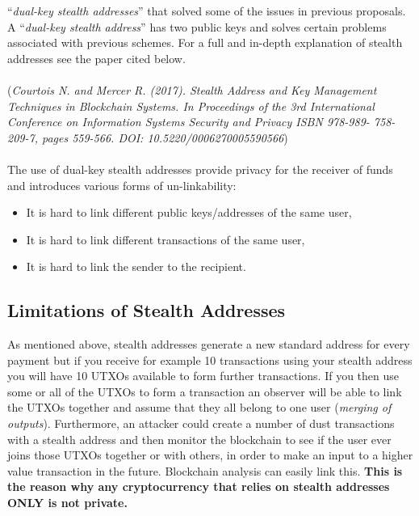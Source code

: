 “\textit{dual-key stealth addresses}” that solved some of the issues in 
previous proposals. A “\textit{dual-key stealth address}” has two public 
keys and solves certain problems associated with previous schemes. For a 
full and in-depth explanation of stealth addresses see the paper cited below.
\\
\\
\noindent
(\textit{Courtois N. and Mercer R. (2017). Stealth Address and Key Management
Techniques in Blockchain Systems. In Proceedings of the 3rd International
Conference on Information Systems Security and Privacy ISBN 978-989-
758-209-7, pages 559-566. DOI: 10.5220/0006270005590566})
\\
\\
\noindent
The use of dual-key stealth addresses provide privacy for the receiver of
funds and introduces various forms of un-linkability:

\begin{itemize}
	\item It is hard to	link different public keys/addresses of the same user,
	\item It is hard to	link different transactions of the same user,
	\item It is hard to link the sender to the recipient.
\end{itemize}

\subsection{Limitations of Stealth Addresses}
As mentioned above, stealth addresses generate a new standard address for
every payment but if you receive for example 10 transactions using your
stealth address you will have 10 UTXOs available to form further
transactions. If you then use some or all of the UTXOs to form a transaction
an observer will be able to link the UTXOs together and assume that they all
belong to one user (\textit{merging of outputs}). Furthermore, an attacker could
create a number of dust transactions with a stealth address and then monitor
the blockchain to see if the user ever joins those UTXOs together or with
others, in order to make an input to a higher value transaction in the future.
Blockchain analysis can easily link this. \textbf{This is the reason why any
cryptocurrency that relies on stealth addresses ONLY is not private.}
\newpage

